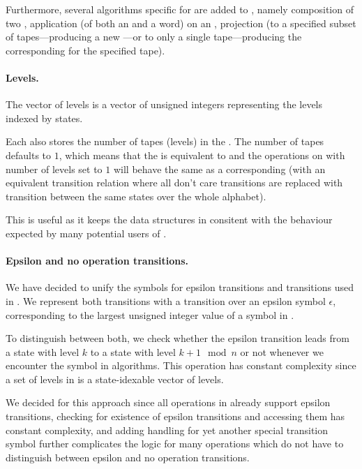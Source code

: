 Furthermore, several algorithms specific for \nfts are added to \mata, namely composition of two \nfts, application (of both an \nfa and a word) on an \nft, projection (to a specified subset of \nft tapes---producing a new \nft---or to only a single tape---producing the corresponding \nfa for the specified tape).

\paragraph{Levels.}
The vector of levels is a vector of unsigned integers representing the levels indexed by states.

Each \nft also stores the number of tapes (levels) in the \nft.
The number of tapes defaults to $1$, which means that the \nft is equivalent to \nfa and the operations on \nfts with number of levels set to $1$ will behave the same as a corresponding \nfa (with an equivalent transition relation where all don't care transitions are replaced with transition between the same states over the whole alphabet).

This is useful as it keeps the data structures in \mata consitent with the behaviour expected by many potential users of \mata.

\paragraph{Epsilon and no operation transitions.}
We have decided to unify the symbols for epsilon transitions and \nop transitions used in \mata.
We represent both transitions with a transition over an epsilon symbol $\epsilon$, corresponding to the largest unsigned integer value of a symbol in \mata.

To distinguish between both, we check whether the epsilon transition leads from a state with level $k$ to a state with level $k + 1 \mod n$ or not whenever we encounter the symbol in algorithms.
This operation has constant complexity since a set of levels in \mata is a state-idexable vector of levels.

We decided for this approach since all operations in \mata already support epsilon transitions, checking for existence of epsilon transitions and accessing them has constant complexity, and adding handling for yet another special transition symbol further complicates the logic for many operations which do not have to distinguish between epsilon and no operation transitions.

